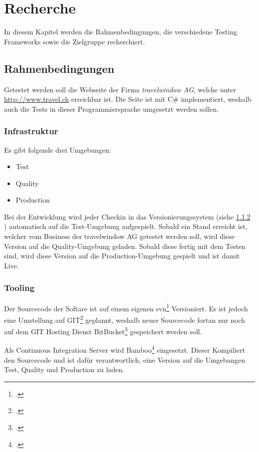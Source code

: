 \chapter{Recherche}

In diesem Kapitel werden die Rahmenbedingungen, die verschiedene Testing Frameworks sowie die Zielgruppe recherchiert.

\section{Rahmenbedingungen}
\label{sec:Recherche:Rahmenbedingungen}
Getestet werden soll die Webseite der Firma \textit{travelwindow AG}, welche unter \url{http://www.travel.ch} erreichbar ist. Die Seite ist mit C\# implementiert, weshalb auch die Tests in dieser Programmiersprache umgesetzt werden sollen.

\subsection{Infrastruktur}
\label{sec:Recherche:Rahmenbedingungen:Infrastruktur}
Es gibt folgende drei Umgebungen:
\begin{itemize}
\item Test
\item Quality
\item Production
\end{itemize}
Bei der Entwicklung wird jeder Checkin in das Versionierungssystem (siehe \cref{sec:Recherche:Rahmenbedingungen:Tooling} ) automatisch auf die Test-Umgebung aufgespielt. Sobald ein Stand erreicht ist, welcher vom Business der travelwindow AG getestet werden soll, wird diese Version auf die Quality-Umgebung geladen. Sobald diese fertig mit dem Testen sind, wird diese Version auf die Production-Umgebung gespielt und ist damit Live.

\subsection{Tooling}
\label{sec:Recherche:Rahmenbedingungen:Tooling}
Der Sourcecode der Softare ist auf einem eigenen \gls{svn}\footcite{Apache_Subversion_2015-07-26} Versioniert. Es ist jedoch eine Umstellung auf GIT\footcite{Git_2015-07-26} geplannt, weshalb neuer Sourcecode fortan nur noch auf dem GIT Hosting Dienst BitBucket\footcite{Git_and_Mercurial_code_management_for_teams_2015-07-26} gespeichert werden soll.

Als Continuous Integration Server wird Bamboo\footcite{Bamboo_2015-07-26} eingesetzt. Dieser Kompiliert den Sourcecode und ist dafür verantwortlich, eine Version auf die Umgebungen Test, Quality und Production zu laden.

